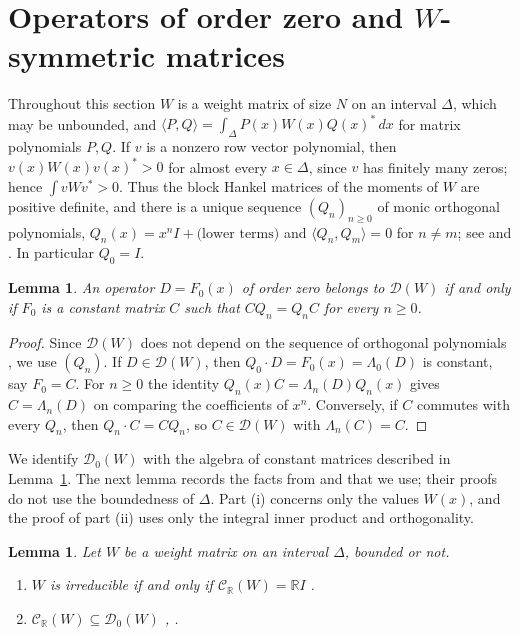 \documentclass[11pt]{amsart}
\newtheorem{lemma}[theorem]{Lemma}
\theoremstyle{definition}
\theoremstyle{remark}
\numberwithin{equation}{section}
\newcommand{\R}{\mathbb{R}}
\newcommand{\cD}{\mathcal{D}}
\newcommand{\CR}{\mathcal{C}_{\R}}
\newcommand{\ip}[2]{\langle #1,#2\rangle}
\begin{document}
\section{Operators of order zero and \texorpdfstring{$W$}{W}-symmetric matrices}\label{sec:prelim}

Throughout this section $W$ is a weight matrix of size $N$ on an interval
$\Delta$, which may be unbounded, and
$\ip PQ=\int_\Delta P(x)W(x)Q(x)^*\,dx$ for matrix polynomials $P,Q$. If $v$
is a nonzero row vector polynomial, then $v(x)W(x)v(x)^*>0$ for almost every
$x\in\Delta$, since $v$ has finitely many zeros; hence $\int v W v^*>0$. Thus
the block Hankel matrices of the moments of $W$ are positive definite, and
there is a unique sequence $(Q_n)_{n\ge0}$ of monic orthogonal polynomials,
$Q_n(x)=x^nI+\text{(lower terms)}$ and $\ip{Q_n}{Q_m}=0$ for $n\ne m$; see
\cite{Kre49} and \cite[Section~2.1]{BP26}. In particular $Q_0=I$.

\begin{lemma}\label{lem:orderzero}
An operator $D=F_0(x)$ of order zero belongs to $\cD(W)$ if and only if $F_0$
is a constant matrix $C$ such that $CQ_n=Q_nC$ for every $n\ge0$.
\end{lemma}

\begin{proof}
Since $\cD(W)$ does not depend on the sequence of orthogonal polynomials
\cite[Remark~2.3]{BP26}, we use $(Q_n)$. If $D\in\cD(W)$, then
$Q_0\cdot D=F_0(x)=\Lambda_0(D)$ is constant, say $F_0=C$. For $n\ge0$ the
identity $Q_n(x)C=\Lambda_n(D)Q_n(x)$ gives $C=\Lambda_n(D)$ on comparing
the coefficients of $x^n$. Conversely, if $C$ commutes with every $Q_n$, then
$Q_n\cdot C=CQ_n$, so $C\in\cD(W)$ with $\Lambda_n(C)=C$.
\end{proof}

We identify $\cD_0(W)$ with the algebra of constant matrices described in
Lemma~\ref{lem:orderzero}. The next lemma records the facts from
\cite{TZ18} and \cite{KR16} that we use; their proofs do not use the
boundedness of $\Delta$. Part (i) concerns only the values $W(x)$, and the
proof of part (ii) uses only the integral inner product and orthogonality.

\begin{lemma}\label{lem:TZ}
Let $W$ be a weight matrix on an interval $\Delta$, bounded or not.
\begin{enumerate}
\item[(i)] $W$ is irreducible if and only if $\CR(W)=\R I$
\cite[Theorem~2.8, Corollary~2.11]{TZ18}.
\item[(ii)] $\CR(W)\subseteq\cD_0(W)$ \cite[Theorem~4.2]{TZ18},
\cite[Lemma~3.1]{KR16}.
\end{enumerate}
\end{lemma}
\end{document}
